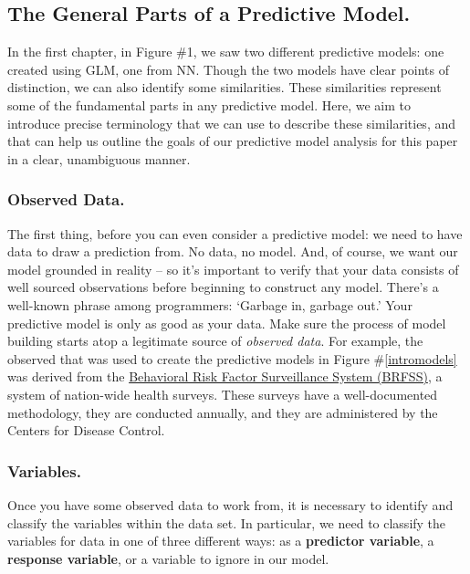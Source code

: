 \documentclass[12pt]{article}
\begin{document}
\subsection{The General Parts of a Predictive Model.}
	In the first chapter, in Figure \#1, we saw two different predictive models:  one created using GLM, one from NN.  Though the two models
have clear points of distinction, we can also identify some similarities.  These similarities represent some of the fundamental parts in any
predictive model.  Here, we aim to introduce precise terminology that we can use to describe these similarities, and that can help us outline the
goals of our predictive model analysis for this paper in a clear, unambiguous manner.

	\subsubsection{Observed Data.}
	The first thing, before you can even consider a predictive model:  we need to have data to draw a prediction from.  No data, no model.  And,
of course, we want our model grounded in reality -- so it's important to verify that your data consists of well sourced observations before 
beginning to construct any model.  There's a well-known phrase among programmers:  `Garbage in, garbage out.'  Your predictive model is only as 
good as your data.  Make sure the process of model building starts atop a legitimate source of \textit{observed data}.  For example, the observed that was used to create the predictive models in Figure \#\ref{intromodels} was derived from the \href{https://www.cdc.gov/brfss/index.html}{Behavioral Risk Factor Surveillance System (BRFSS)}, a system of nation-wide health surveys.  These surveys have a well-documented methodology, they are conducted annually, and they are administered by the Centers for Disease Control.

	\subsubsection{Variables.}
	Once you have some observed data to work from, it is necessary to identify and classify the variables within the data set.  In particular, we 
need to classify the variables for data in one of three different ways: as a \textbf{predictor variable}, a \textbf{response variable}, or a variable to ignore in our model.  
\end{document}
